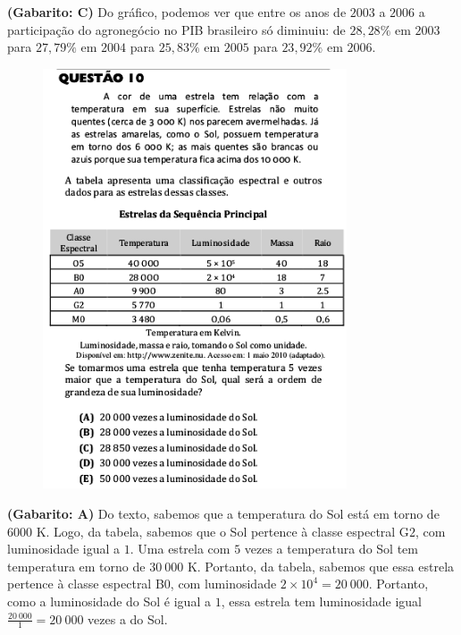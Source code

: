\documentclass[a4paper]{article}
\begin{document}
\par\textbf{(Gabarito: C)} Do gráfico, podemos ver que entre os anos de $2003$ a $2006$ a participação do agronegócio no PIB brasileiro só diminuiu: de $28,28\%$ em $2003$ para $27,79\%$ em $2004$ para $25,83\%$ em $2005$ para $23,92\%$ em $2006$.
\begin{figure}[H]
	\begin{center}
		\includegraphics[width=9cm]{L1Q10.png}
	\end{center}
\end{figure}
\par\textbf{(Gabarito: A)} Do texto, sabemos que a temperatura do Sol está em torno de $6000$ K. Logo, da tabela, sabemos que o Sol pertence à classe espectral G$2$, com luminosidade igual a $1$. Uma estrela com $5$ vezes a temperatura do Sol tem temperatura em torno de $30\ 000$ K. Portanto, da tabela, sabemos que essa estrela pertence à classe espectral B$0$, com luminosidade $2\times10^4 = 20\ 000$. Portanto, como a luminosidade do Sol é igual a $1$, essa estrela tem luminosidade igual $\displaystyle{ \frac{20\ 000}{1} = 20\ 000}$ vezes a do Sol.
\end{document}
